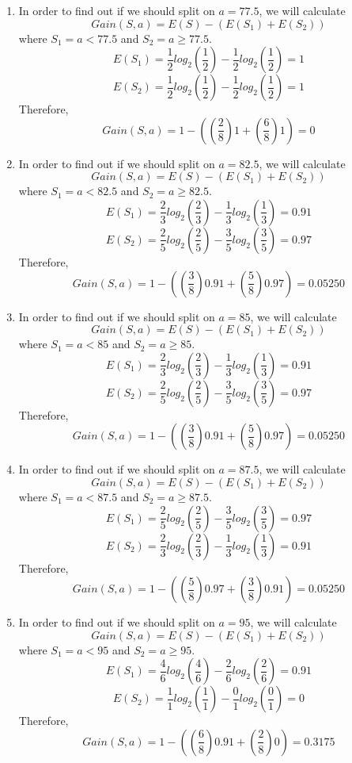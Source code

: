 \documentclass[12pt]{article}
\begin{document}
\begin{enumerate}
\begin{enumerate}
\begin{enumerate}
                \item In order to find out if we should split on $a = 77.5$, we will calculate \[Gain(S, a) = E(S) - (E(S_1) + E(S_2))\] 
                where $S_1 = a < 77.5$ and $S_2 = a \geq 77.5$. 
                \[E(S_1) = \frac{1}{2}log_2(\frac{1}{2}) - \frac{1}{2}log_2(\frac{1}{2}) = 1\]
                \[E(S_2) = \frac{1}{2}log_2(\frac{1}{2}) - \frac{1}{2}log_2(\frac{1}{2}) = 1\]
                Therefore, 
                \[Gain(S, a) = 1 - ((\frac{2}{8})1 + (\frac{6}{8})1) = 0\]
                
                \item In order to find out if we should split on $a = 82.5$, we will calculate \[Gain(S, a) = E(S) - (E(S_1) + E(S_2))\] 
                where $S_1 = a < 82.5$ and $S_2 = a \geq 82.5$. 
                \[E(S_1) = \frac{2}{3}log_2(\frac{2}{3}) - \frac{1}{3}log_2(\frac{1}{3}) = 0.91\]
                \[E(S_2) = \frac{2}{5}log_2(\frac{2}{5}) - \frac{3}{5}log_2(\frac{3}{5}) = 0.97\]
                Therefore, 
                \[Gain(S, a) = 1 - ((\frac{3}{8})0.91 + (\frac{5}{8})0.97) = 0.05250\] 
                
                \item In order to find out if we should split on $a = 85$, we will calculate \[Gain(S, a) = E(S) - (E(S_1) + E(S_2))\] 
                where $S_1 = a < 85$ and $S_2 = a \geq 85$. 
                \[E(S_1) = \frac{2}{3}log_2(\frac{2}{3}) - \frac{1}{3}log_2(\frac{1}{3}) = 0.91\]
                \[E(S_2) = \frac{2}{5}log_2(\frac{2}{5}) - \frac{3}{5}log_2(\frac{3}{5}) = 0.97\]
                Therefore, 
                \[Gain(S, a) = 1 - ((\frac{3}{8})0.91 + (\frac{5}{8})0.97) = 0.05250\] 
                
                \item In order to find out if we should split on $a = 87.5$, we will calculate \[Gain(S, a) = E(S) - (E(S_1) + E(S_2))\] 
                where $S_1 = a < 87.5$ and $S_2 = a \geq 87.5$. 
                \[E(S_1) = \frac{2}{5}log_2(\frac{2}{5}) - \frac{3}{5}log_2(\frac{3}{5}) = 0.97\]
                \[E(S_2) = \frac{2}{3}log_2(\frac{2}{3}) - \frac{1}{3}log_2(\frac{1}{3}) = 0.91\]
                Therefore, 
                \[Gain(S, a) = 1 - ((\frac{5}{8})0.97 + (\frac{3}{8})0.91) = 0.05250\]
                
                \item In order to find out if we should split on $a = 95$, we will calculate \[Gain(S, a) = E(S) - (E(S_1) + E(S_2))\] 
                where $S_1 = a < 95$ and $S_2 = a \geq 95$. 
                \[E(S_1) = \frac{4}{6}log_2(\frac{4}{6}) - \frac{2}{6}log_2(\frac{2}{6}) = 0.91\]
                \[E(S_2) = \frac{1}{1}log_2(\frac{1}{1}) - \frac{0}{1}log_2(\frac{0}{1}) = 0\]
                Therefore, 
                \[Gain(S, a) = 1 - ((\frac{6}{8})0.91 + (\frac{2}{8})0) = 0.3175\]
                

\end{enumerate}
\end{enumerate}
\end{enumerate}
\end{document}
